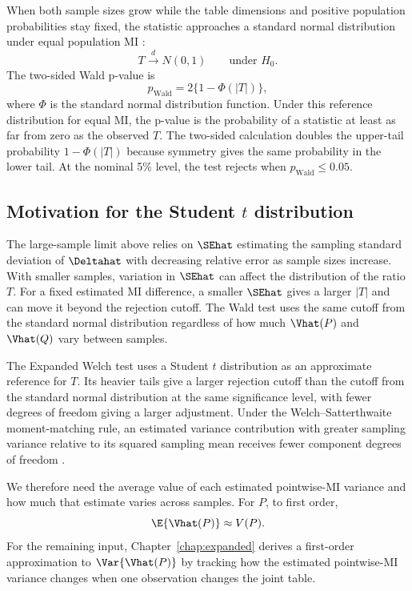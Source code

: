 When both sample sizes grow while the table dimensions and positive
population probabilities stay fixed, the statistic approaches a standard
normal distribution under equal population MI
\citep{wald1943,vanderVaart1998}:
\begin{equation}
  T\xrightarrow{d}N(0,1)
  \qquad\text{under }H_0.
\end{equation}
The two-sided Wald p-value is
\begin{equation}
  p_{\mathrm{Wald}}
  =2\{1-\Phi(|T|)\},
  \label{eq:wald-pvalue}
\end{equation}
where \(\Phi\) is the standard normal distribution function. Under this
reference distribution for equal MI, the p-value is the probability of a
statistic at least as far from zero as the observed \(T\). The
two-sided calculation doubles the upper-tail probability
\(1-\Phi(|T|)\) because symmetry gives the same probability in the
lower tail.
At the nominal 5\% level, the test rejects when \(p_{\mathrm{Wald}}\leq0.05\).

\subsection{Motivation for the Student \texorpdfstring{\(t\)}{t} distribution}

The large-sample limit above relies on \(\SEhat\) estimating the
sampling standard deviation of \(\Deltahat\) with decreasing relative
error as sample sizes increase. With smaller samples, variation in
\(\SEhat\) can affect the distribution of the ratio \(T\). For a fixed
estimated MI difference, a smaller \(\SEhat\) gives a larger \(|T|\)
and can move it beyond the rejection cutoff. The Wald test uses the same
cutoff from the standard normal distribution regardless of how much
\(\Vhat(P)\) and \(\Vhat(Q)\) vary between samples.

The Expanded Welch test uses a Student \(t\) distribution as an approximate
reference for \(T\). Its heavier tails give a larger rejection cutoff
than the cutoff from the standard normal distribution at the same
significance level, with fewer degrees of freedom giving a larger
adjustment. Under the Welch--Satterthwaite moment-matching rule, an
estimated variance contribution with greater sampling variance relative to its squared
sampling mean receives fewer component degrees of freedom
\citep{satterthwaite1946}.

We therefore need the average value of each estimated pointwise-MI
variance and how much that estimate varies across samples. For \(P\),
to first order,
\begin{equation}
  \E\{\Vhat(P)\}\approx V(P).
\end{equation}
For the remaining input, Chapter~\ref{chap:expanded} derives a first-order
approximation to \(\Var\{\Vhat(P)\}\) by tracking how the estimated
pointwise-MI variance changes when one observation changes the joint table.
